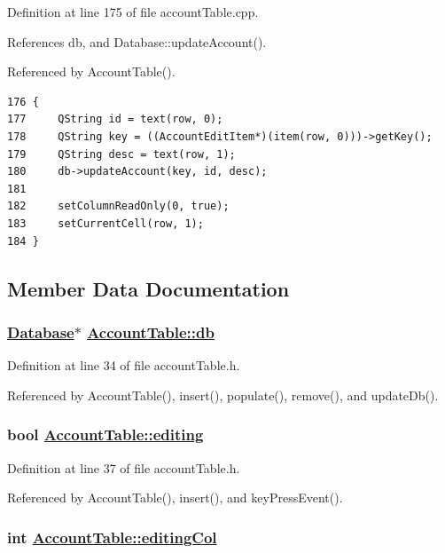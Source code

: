 Definition at line 175 of file account\-Table.cpp.

References db, and Database::update\-Account().

Referenced by Account\-Table().

\footnotesize\begin{verbatim}176 {
177     QString id = text(row, 0);
178     QString key = ((AccountEditItem*)(item(row, 0)))->getKey();
179     QString desc = text(row, 1);
180     db->updateAccount(key, id, desc);
181 
182     setColumnReadOnly(0, true);
183     setCurrentCell(row, 1);
184 }
\end{verbatim}\normalsize 




\subsection{Member Data Documentation}
\hypertarget{classAccountTable_r0}{
\subsubsection[db]{\setlength{\rightskip}{0pt plus 5cm}\hyperlink{classDatabase}{Database}$\ast$ \hyperlink{classAccountTable_r0}{Account\-Table::db}}}
\label{classAccountTable_r0}


Definition at line 34 of file account\-Table.h.

Referenced by Account\-Table(), insert(), populate(), remove(), and update\-Db().\hypertarget{classAccountTable_r2}{
\subsubsection[editing]{\setlength{\rightskip}{0pt plus 5cm}bool \hyperlink{classAccountTable_r2}{Account\-Table::editing}}}
\label{classAccountTable_r2}


Definition at line 37 of file account\-Table.h.

Referenced by Account\-Table(), insert(), and key\-Press\-Event().\hypertarget{classAccountTable_r4}{
\subsubsection[editingCol]{\setlength{\rightskip}{0pt plus 5cm}int \hyperlink{classAccountTable_r4}{Account\-Table::editing\-Col}}}
\label{classAccountTable_r4}


